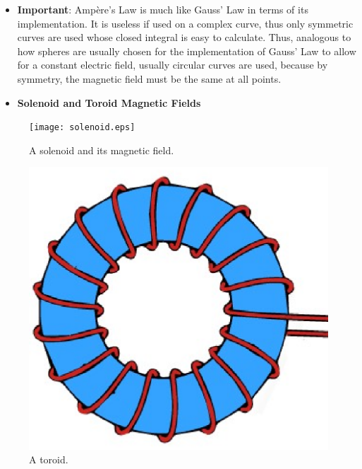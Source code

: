 \documentclass{scrartcl}
\begin{document}
    \begin{itemize}
        \item \textbf{Important}: Amp\`ere's Law is much like Gauss' Law in terms of its implementation. It is useless if used on a complex curve, thus only symmetric curves are used whose closed integral is easy to calculate. Thus, analogous to how spheres are usually chosen for the implementation of Gauss' Law to allow for a constant electric field, usually circular curves are used, because by symmetry, the magnetic field must be the same at all points.
        \item \textbf{Solenoid and Toroid Magnetic Fields}
    \end{itemize}
    \begin{figure}[H]
        \centering
        \begin{minipage}[b]{0.55\textwidth}
            \texttt{[image: solenoid.eps]}
            \caption{A solenoid and its magnetic field.}
        \end{minipage}
        \hfill
        \begin{minipage}[b]{0.3\textwidth}
            \includegraphics[width=\textwidth]{toroid.eps}
            \caption{A toroid.}
        \end{minipage}
    \end{figure}
\end{document}
